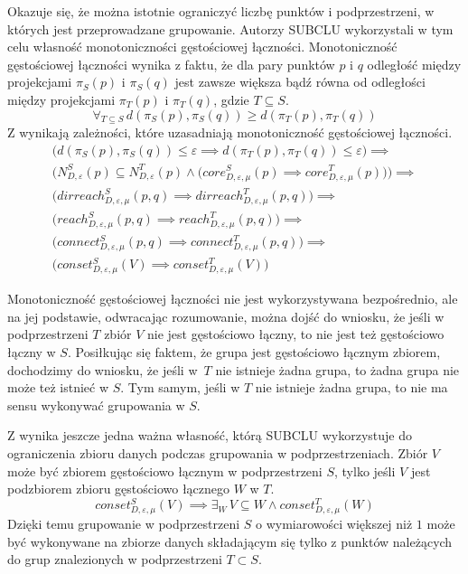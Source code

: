 Okazuje się, że można istotnie ograniczyć liczbę punktów i podprzestrzeni, w których jest przeprowadzane grupowanie. Autorzy SUBCLU wykorzystali w tym celu własność monotoniczności gęstościowej łączności. Monotoniczność gęstościowej łączności wynika z faktu, że dla pary punktów $ p $ i $ q $ odległość między projekcjami $ \pi_S(p) $ i $ \pi_S(q) $ jest zawsze większa bądź równa od odległości między projekcjami $ \pi_T(p) $ i $ \pi_T(q) $, gdzie $ T \subseteq S $. 
\begin{equation}\label{eq:d-vs-d-projected}
\forall_{T\subseteq S}\,d(\pi_S(p),\pi_S(q)) \geq d(\pi_T(p), \pi_T(q))
\end{equation}
Z  wynikają zależności, które uzasadniają monotoniczność gęstościowej łączności.
\begin{equation}
	\begin{array}{l}
		\big(d(\pi_S(p),\pi_S(q)) \le \varepsilon \implies d(\pi_T(p), \pi_T(q)) \le \varepsilon\big) \implies\\
		\big(N^S_{D,\varepsilon}(p) \subseteq N^T_{D,\varepsilon}(p) \land \big(core^S_{D,\varepsilon,\mu}(p) \implies core^T_{D,\varepsilon,\mu}(p)\big)\big) \implies \\
		\big(dirreach^S_{D,\varepsilon,\mu}(p, q) \implies dirreach^T_{D,\varepsilon,\mu}(p, q)\big) \implies \\
		\big(reach^S_{D,\varepsilon,\mu}(p, q) \implies reach^T_{D,\varepsilon,\mu}(p, q)\big) \implies \\
		\big(connect^S_{D,\varepsilon,\mu}(p, q) \implies connect^T_{D,\varepsilon,\mu}(p, q)\big) \implies \\
		\big(conset^S_{D,\varepsilon,\mu}(V) \implies conset^T_{D,\varepsilon,\mu}(V)\big)
	\end{array}
\end{equation}

Monotoniczność gęstościowej łączności nie jest wykorzystywana bezpośrednio, ale na jej podstawie, odwracając rozumowanie, można dojść do wniosku, że jeśli w podprzestrzeni $ T $ zbiór $ V $ nie jest gęstościowo łączny, to nie jest też gęstościowo łączny w $ S $. Posiłkując się faktem, że grupa jest gęstościowo łącznym zbiorem, dochodzimy do wniosku, że jeśli \mbox{w $ T $} nie istnieje żadna grupa, to żadna grupa nie może też istnieć w $ S $. Tym samym, jeśli w $ T $ nie istnieje żadna grupa, to nie ma sensu wykonywać grupowania w $ S $.

Z  wynika jeszcze jedna ważna własność, którą SUBCLU wykorzystuje do ograniczenia zbioru danych podczas grupowania w podprzestrzeniach. Zbiór $ V $ może być zbiorem gęstościowo łącznym w podprzestrzeni $ S $, tylko jeśli $ V $ jest podzbiorem zbioru gęstościowo łącznego $ W $ w $ T $.
\begin{equation}
 conset^S_{D,\varepsilon,\mu}(V) \implies \exists_W\,V\subseteq W \land conset^T_{D,\varepsilon,\mu}(W)
\end{equation}
Dzięki temu grupowanie w podprzestrzeni $ S $ o wymiarowości większej niż $ 1 $ może być wykonywane na zbiorze danych składającym się tylko z punktów należących do grup znalezionych w podprzestrzeni $ T \subset S $.

